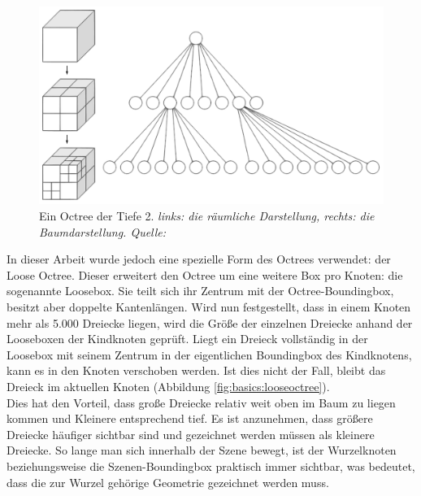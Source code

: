 \begin{figure}
 \centering
  \includegraphics[scale=0.5]{images/octree.pdf}
  \caption{Ein Octree der Tiefe 2. \textit{links: die räumliche Darstellung, rechts: die Baumdarstellung. Quelle: \cite{wikioctree}}}
 \label{fig:basics:octree}
\end{figure}
In dieser Arbeit wurde jedoch eine spezielle Form des Octrees verwendet: der Loose Octree. Dieser erweitert den Octree um eine weitere Box pro Knoten: die sogenannte Loosebox. Sie teilt sich ihr Zentrum mit der Octree-Boundingbox, besitzt aber doppelte Kantenlängen. Wird nun festgestellt, dass in einem Knoten mehr als 5.000 Dreiecke liegen, wird die Größe der einzelnen Dreiecke anhand der Looseboxen der Kindknoten geprüft. Liegt ein Dreieck vollständig in der Loosebox mit seinem Zentrum in der eigentlichen Boundingbox des Kindknotens, kann es in den Knoten verschoben werden. Ist dies nicht der Fall, bleibt das Dreieck im aktuellen Knoten (Abbildung \ref{fig:basics:looseoctree}).\\
Dies hat den Vorteil, dass große Dreiecke relativ weit oben im Baum zu liegen kommen und Kleinere entsprechend tief. Es ist anzunehmen, dass größere Dreiecke häufiger sichtbar sind und gezeichnet werden müssen als kleinere Dreiecke. So lange man sich innerhalb der Szene bewegt, ist der Wurzelknoten beziehungsweise die Szenen-Boundingbox praktisch immer sichtbar, was bedeutet, dass die zur Wurzel gehörige Geometrie gezeichnet werden muss.
